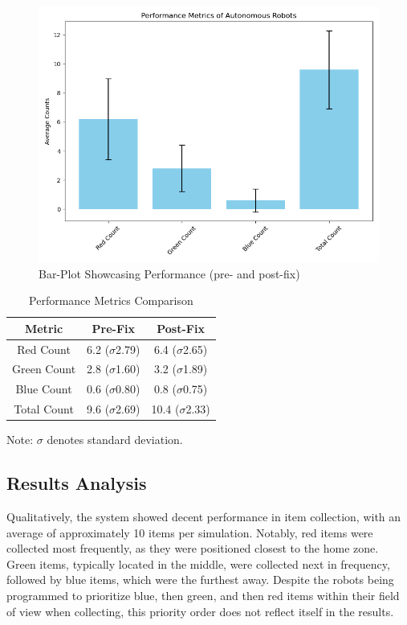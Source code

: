 \documentclass[conference]{IEEEtran}
\begin{document}
\begin{figure}[htbp]
\centerline{\includegraphics[width=\linewidth]{performance_metrics.png}}
\caption{Bar-Plot Showcasing Performance (pre- and post-fix)}
\label{fig:performancegraph}
\end{figure}

\begin{table}[htbp]
\caption{Performance Metrics Comparison}
\begin{center}
\begin{tabular}{|c|c|c|}
\hline
\textbf{Metric} & \textbf{Pre-Fix} & \textbf{Post-Fix} \\
\hline
Red Count & 6.2 ($\sigma$2.79) & 6.4 ($\sigma$2.65) \\
\hline
Green Count & 2.8 ($\sigma$1.60) & 3.2 ($\sigma$1.89) \\
\hline
Blue Count & 0.6 ($\sigma$0.80) & 0.8 ($\sigma$0.75) \\
\hline
Total Count & 9.6 ($\sigma$2.69) & 10.4 ($\sigma$2.33) \\
\hline
\end{tabular}
\label{tab:performance}
\end{center}
\end{table}

\footnotesize{Note: $\sigma$ denotes standard deviation.}


\subsection{Results Analysis}

Qualitatively, the system showed decent performance in item collection, with an average of approximately 10 items per simulation. Notably, red items were collected most frequently, as they were positioned closest to the home zone. Green items, typically located in the middle, were collected next in frequency, followed by blue items, which were the furthest away. Despite the robots being programmed to prioritize blue, then green, and then red items within their field of view when collecting, this priority order does not reflect itself in the results.
\end{document}
